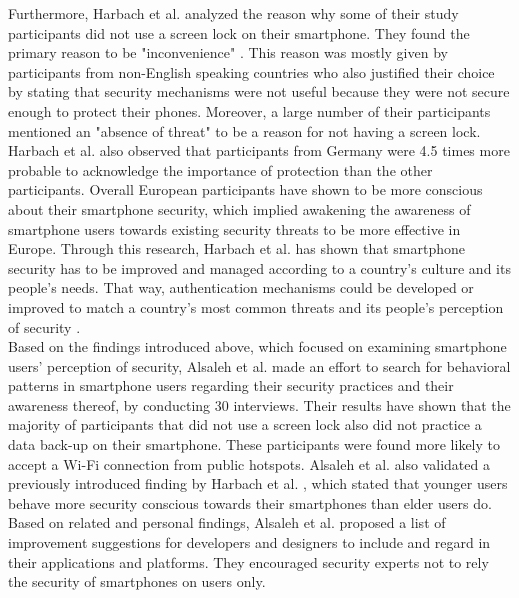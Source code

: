 Furthermore, Harbach et al. \cite{Harbach:2016} analyzed the reason why some of their study participants did not use a screen lock on their smartphone. They found the primary reason to be "inconvenience" \cite{Harbach:2016}. This reason was mostly given by participants from non-English speaking countries who also justified their choice by stating that security mechanisms were not useful because they were not secure enough to protect their phones. Moreover, a large number of their participants mentioned an "absence of threat" \cite{Harbach:2016} to be a reason for not having a screen lock. Harbach et al. \cite{Harbach:2016} also observed that participants from Germany were 4.5 times more probable to acknowledge the importance of protection than the other participants. Overall European participants have shown to be more conscious about their smartphone security, which implied awakening the awareness of smartphone users towards existing security threats to be more effective in Europe. Through this research, Harbach et al. \cite{Harbach:2016} has shown that smartphone security has to be improved and managed according to a country's culture and its people's needs. That way, authentication mechanisms could be developed or improved to match a country's most common threats and its people's perception of security \cite{Harbach:2016}. \\ 

Based on the findings introduced above, which focused on examining smartphone users' perception of security, Alsaleh et al. \cite{Alsaleh} made an effort to search for behavioral patterns in smartphone users regarding their security practices and their awareness thereof, by conducting 30 interviews. Their results have shown that the majority of participants that did not use a screen lock also did not practice a data back-up on their smartphone. These participants were found more likely to accept a Wi-Fi connection from public hotspots. Alsaleh et al. \cite{Alsaleh} also validated a previously introduced finding by Harbach et al. \cite{Harbach:2016}, which stated that younger users behave more security conscious towards their smartphones than elder users do. Based on related and personal findings, Alsaleh et al. \cite{Alsaleh} proposed a list of improvement suggestions for developers and designers to include and regard in their applications and platforms. They encouraged security experts not to rely the security of smartphones on users only.\\

